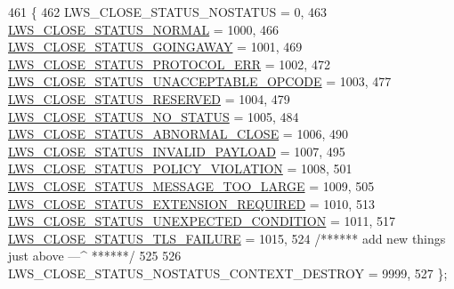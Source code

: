 \begin{DoxyCode}
461                       \{
462         LWS\_CLOSE\_STATUS\_NOSTATUS                               =    0,
463         \hyperlink{group__wsclose_ggae399c571df32ba532c0ca67da9284985a3ffa38d5081b85fb739e02a747ccf2c4}{LWS\_CLOSE\_STATUS\_NORMAL}                                  = 1000,
466         \hyperlink{group__wsclose_ggae399c571df32ba532c0ca67da9284985a9737a68759e739856b150ff9dfa30218}{LWS\_CLOSE\_STATUS\_GOINGAWAY}                            = 1001,
469         \hyperlink{group__wsclose_ggae399c571df32ba532c0ca67da9284985a1bb501d212fa4d57053db681b1dfab98}{LWS\_CLOSE\_STATUS\_PROTOCOL\_ERR}                              = 1002,
472         \hyperlink{group__wsclose_ggae399c571df32ba532c0ca67da9284985a462c99b05459df700919cfd3f53c8276}{LWS\_CLOSE\_STATUS\_UNACCEPTABLE\_OPCODE}                        = 
      1003,
477         \hyperlink{group__wsclose_ggae399c571df32ba532c0ca67da9284985af90cb98d983ad3d4c79df9b6f3d4a4d2}{LWS\_CLOSE\_STATUS\_RESERVED}                              = 1004,
479         \hyperlink{group__wsclose_ggae399c571df32ba532c0ca67da9284985a4b8a3b7ce6f731e5248e4b0fb64a5044}{LWS\_CLOSE\_STATUS\_NO\_STATUS}                            = 1005,
484         \hyperlink{group__wsclose_ggae399c571df32ba532c0ca67da9284985a68b3d34bebd88547dcfa5cadba0acd6c}{LWS\_CLOSE\_STATUS\_ABNORMAL\_CLOSE}                          = 1006,
490         \hyperlink{group__wsclose_ggae399c571df32ba532c0ca67da9284985a7aef2da0062da606eeb35aaca5cf9050}{LWS\_CLOSE\_STATUS\_INVALID\_PAYLOAD}                        = 1007,
495         \hyperlink{group__wsclose_ggae399c571df32ba532c0ca67da9284985ad09e68295eabdddcba4e332fbea70ae5}{LWS\_CLOSE\_STATUS\_POLICY\_VIOLATION}                      = 1008,
501         \hyperlink{group__wsclose_ggae399c571df32ba532c0ca67da9284985a2e1f0113494a58e762eed3d22e7080d8}{LWS\_CLOSE\_STATUS\_MESSAGE\_TOO\_LARGE}                    = 1009,
505         \hyperlink{group__wsclose_ggae399c571df32ba532c0ca67da9284985ac6a161822783ee873be1c66f48d14e0e}{LWS\_CLOSE\_STATUS\_EXTENSION\_REQUIRED}                  = 1010,
513         \hyperlink{group__wsclose_ggae399c571df32ba532c0ca67da9284985ad0869604d79e13700ae5d196a431b350}{LWS\_CLOSE\_STATUS\_UNEXPECTED\_CONDITION}                      = 
      1011,
517         \hyperlink{group__wsclose_ggae399c571df32ba532c0ca67da9284985ad2b477a91c8445bf34ecd43977f9b390}{LWS\_CLOSE\_STATUS\_TLS\_FAILURE}                                = 1015,
524         \textcolor{comment}{/****** add new things just above ---^ ******/}
525 
526         LWS\_CLOSE\_STATUS\_NOSTATUS\_CONTEXT\_DESTROY               = 9999,
527 \};
\end{DoxyCode}


